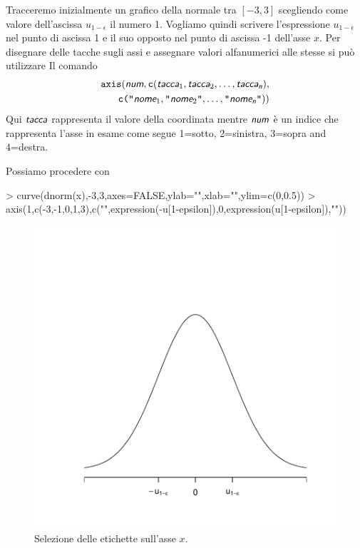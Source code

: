 \documentclass[onecolumn,11pt]{book}
\newcommand{\varia}[1]{\textsl{\textsf{#1}}}
\begin{document}
Tracceremo inizialmente un grafico della normale tra $[-3,3]$ scegliendo come valore dell'ascissa 
$u_{1-\epsilon}$  il numero  1.  Vogliamo quindi scrivere l'espressione $u_{1-\epsilon}$ nel punto di ascissa  1 e il suo opposto nel punto di ascissa -1 dell'asse $x$. 
Per disegnare delle tacche sugli assi e assegnare valori alfanumerici alle stesse
si pu\`o utilizzare Il comando
\begin{eqnarray*}
\texttt{axis}(\varia{num},\texttt{c}(\varia{tacca}_1,\varia{tacca}_2,\ldots,\varia{tacca}_\varia{n}),\\ 
\texttt{c("}\varia{nome}_1, \texttt{"}\varia{nome}_2 \texttt{"},\ldots,\texttt{"}\varia{nome}_\varia{n}\texttt{"}))
\end{eqnarray*}
Qui $\varia{tacca}$ rappresenta il valore della coordinata mentre $\varia{num}$ \`e un indice che rappresenta  l'asse in esame  come segue 1=sotto, 2=sinistra, 3=sopra and 4=destra.

Possiamo  procedere con
\begin{Schunk}
\begin{Sinput}
> curve(dnorm(x),-3,3,axes=FALSE,ylab="",xlab="",ylim=c(0,0.5))
> axis(1,c(-3,-1,0,1,3),c("",expression(-u[1-epsilon]),0,expression(u[1-epsilon]),""))
\end{Sinput}
\end{Schunk}

\begin{figure}\begin{center}
\includegraphics{statisticaconR-358}
\caption{Selezione delle etichette sull'asse $x$. }
\label{normale13}
\end{center}
\end{figure}
\end{document}
